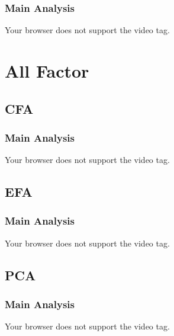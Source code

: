 \documentclass[
  letterpaper,
  DIV=11,
  numbers=noendperiod]{scrreprt}
\begin{document}
\hypertarget{main-analysis-15}{%
\subsection{Main Analysis}\label{main-analysis-15}}

Your browser does not support the video tag.


\hypertarget{all-factor}{%
\chapter{All Factor}\label{all-factor}}

\hypertarget{cfa}{%
\section{CFA}\label{cfa}}

\hypertarget{main-analysis-16}{%
\subsection{Main Analysis}\label{main-analysis-16}}

Your browser does not support the video tag.

\hypertarget{efa}{%
\section{EFA}\label{efa}}

\hypertarget{main-analysis-17}{%
\subsection{Main Analysis}\label{main-analysis-17}}

Your browser does not support the video tag.

\hypertarget{pca}{%
\section{PCA}\label{pca}}

\hypertarget{main-analysis-18}{%
\subsection{Main Analysis}\label{main-analysis-18}}

Your browser does not support the video tag.

\end{document}
